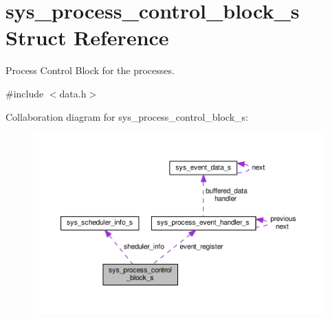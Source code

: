 \hypertarget{structsys__process__control__block__s}{}\section{sys\+\_\+process\+\_\+control\+\_\+block\+\_\+s Struct Reference}
\label{structsys__process__control__block__s}


Process Control Block for the processes.  




{\ttfamily \#include $<$data.\+h$>$}



Collaboration diagram for sys\+\_\+process\+\_\+control\+\_\+block\+\_\+s\+:\nopagebreak
\begin{figure}[H]
\begin{center}
\leavevmode
\includegraphics[width=350pt]{d5/d90/structsys__process__control__block__s__coll__graph}
\end{center}
\end{figure}
